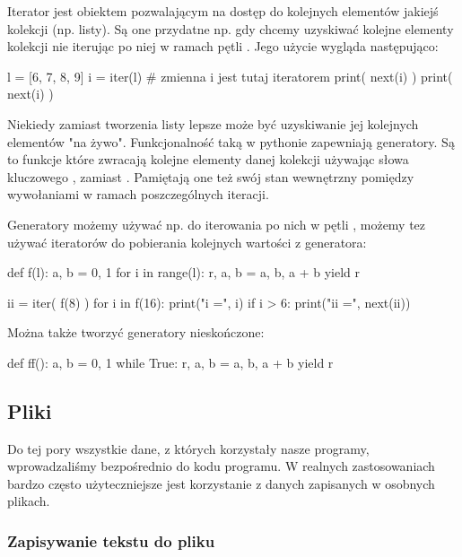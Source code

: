 \documentclass{pdfBooklets}
\begin{document}
Iterator jest obiektem pozwalającym na dostęp do kolejnych elementów jakiejś kolekcji (np. listy).
Są one przydatne np. gdy chcemy uzyskiwać kolejne elementy kolekcji nie iterując po niej w ramach pętli .
Jego użycie wygląda następująco:

\begin{CodeFrame*}[python]{}
l = [6, 7, 8, 9]
i = iter(l)  # zmienna i jest tutaj iteratorem
print( next(i) )
print( next(i) )
\end{CodeFrame*}

Niekiedy zamiast tworzenia listy lepsze może być uzyskiwanie jej kolejnych elementów "na żywo".
Funkcjonalność taką w pythonie zapewniają generatory.
Są to funkcje które zwracają kolejne elementy danej kolekcji używając słowa kluczowego , zamiast .
Pamiętają one też swój stan wewnętrzny pomiędzy wywołaniami w ramach poszczególnych iteracji.

Generatory możemy używać np. do iterowania po nich w pętli ,
możemy tez używać iteratorów do pobierania kolejnych wartości z generatora:

\begin{CodeFrame*}[python]{}
def f(l):
    a, b = 0, 1
    for i in range(l):
        r, a, b = a, b, a + b
        yield r

ii = iter( f(8) )
for i in f(16):
    print("i =", i)
    if i > 6:
        print("ii =", next(ii))
\end{CodeFrame*}

Można także tworzyć generatory nieskończone:

\begin{CodeFrame*}[python]{}
def ff():
    a, b = 0, 1
    while True:
        r, a, b = a, b, a + b
        yield r
\end{CodeFrame*}

\subsection{Pliki}
Do tej pory wszystkie dane, z których korzystały nasze programy, wprowadzaliśmy bezpośrednio do kodu programu.
W realnych zastosowaniach bardzo często użyteczniejsze jest korzystanie z danych zapisanych w osobnych plikach.

\subsubsection{Zapisywanie tekstu do pliku}
\end{document}
